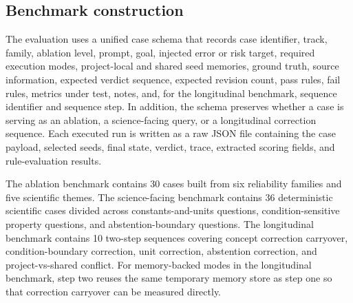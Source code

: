 \documentclass[12pt]{article}
\begin{document}
\subsection{Benchmark construction}

The evaluation uses a unified case schema that records case identifier, track, family, ablation level, prompt, goal, injected error or risk target, required execution modes, project-local and shared seed memories, ground truth, source information, expected verdict sequence, expected revision count, pass rules, fail rules, metrics under test, notes, and, for the longitudinal benchmark, sequence identifier and sequence step. In addition, the schema preserves whether a case is serving as an ablation, a science-facing query, or a longitudinal correction sequence. Each executed run is written as a raw JSON file containing the case payload, selected seeds, final state, verdict, trace, extracted scoring fields, and rule-evaluation results.

The ablation benchmark contains 30 cases built from six reliability families and five scientific themes. The science-facing benchmark contains 36 deterministic scientific cases divided across constants-and-units questions, condition-sensitive property questions, and abstention-boundary questions. The longitudinal benchmark contains 10 two-step sequences covering concept correction carryover, condition-boundary correction, unit correction, abstention correction, and project-vs-shared conflict. For memory-backed modes in the longitudinal benchmark, step two reuses the same temporary memory store as step one so that correction carryover can be measured directly.

\begin{table}[H]
\centering
{}
\caption{Overview of the benchmark design used in the manuscript.}
\label{tab:v6-overview}
\end{table}
\end{document}
